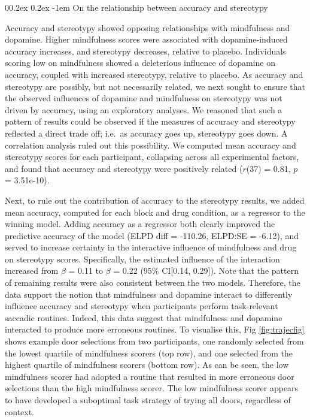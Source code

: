 \documentclass[
  man]{apa6}
\makeatletter
\let\oldparagraph\paragraph
\renewcommand{\paragraph}[1]{\oldparagraph{#1}\mbox{}}
\renewcommand{\paragraph}{\@startsection{paragraph}{4}{\parindent}%
  {0\baselineskip \@plus 0.2ex \@minus 0.2ex}%
  {-1em}%
  {\normalfont\normalsize\bfseries\itshape\typesectitle}}
\makeatother
\begin{document}
\hypertarget{on-the-relationship-between-accuracy-and-stereotypy}{%
\paragraph{On the relationship between accuracy and stereotypy}\label{on-the-relationship-between-accuracy-and-stereotypy}}

Accuracy and stereotypy showed opposing relationships with mindfulness and dopamine. Higher mindfulness scores were associated with dopamine-induced accuracy increases, and stereotypy decreases, relative to placebo. Individuals scoring low on mindfulness showed a deleterious influence of dopamine on accuracy, coupled with increased stereotypy, relative to placebo. As accuracy and stereotypy are possibly, but not necessarily related, we next sought to ensure that the observed influences of dopamine and mindfulness on stereotypy was not driven by accuracy, using an exploratory analyses. We reasoned that such a pattern of results could be observed if the measures of accuracy and stereotypy reflected a direct trade off; i.e.~as accuracy goes up, stereotypy goes down. A correlation analysis ruled out this possibility. We computed mean accuracy and stereotypy scores for each participant, collapsing across all experimental factors, and found that accuracy and stereotypy were positively related (\(r\)(37) = 0.81, \(p\) = 3.51e-10).

Next, to rule out the contribution of accuracy to the stereotypy results, we added mean accuracy, computed for each block and drug condition, as a regressor to the winning model. Adding accuracy as a regressor both clearly improved the predictive accuracy of the model (ELPD diff = -110.26, ELPD:SE = -6.12), and served to increase certainty in the interactive influence of mindfulness and drug on stereotypy scores. Specifically, the estimated influence of the interaction increased from \(\beta\) = 0.11 to \(\beta\) = 0.22 (95\% CI{[}0.14, 0.29{]}). Note that the pattern of remaining results were also consistent between the two models. Therefore, the data support the notion that mindfulness and dopamine interact to differently influence accuracy and stereotypy when participants perform task-relevant saccadic routines. Indeed, this data suggest that mindfulness and dopamine interacted to produce more erroneous routines. To visualise this, Fig \ref{fig:trajecfig} shows example door selections from two participants, one randomly selected from the lowest quartile of mindfulness scorers (top row), and one selected from the highest quartile of mindfulness scorers (bottom row). As can be seen, the low mindfulness scorer had adopted a routine that resulted in more erroneous door selections than the high mindfulness scorer. The low mindfulness scorer appears to have developed a suboptimal task strategy of trying all doors, regardless of context.
\end{document}
